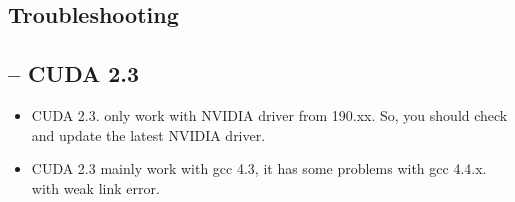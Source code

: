 \subsection{Troubleshooting}
\label{sec:troubleshooting-1}

\subsection{-- CUDA 2.3}

\begin{itemize}
\item CUDA 2.3. only work with NVIDIA driver from 190.xx. So, you
  should check and update the latest NVIDIA driver.

\item CUDA 2.3 mainly work with gcc 4.3, it has some problems with gcc
  4.4.x. with weak link error.
\end{itemize}

